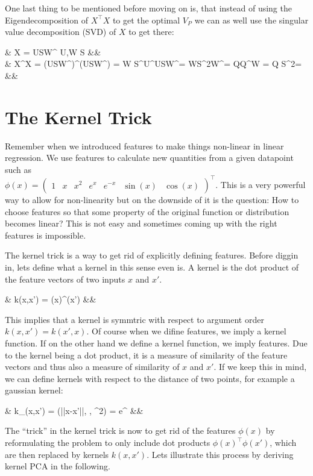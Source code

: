 \documentclass[12pt]{article}
\newcommand{\mat}[1]{\begin{pmatrix} #1 \end{pmatrix}}
\newcommand{\eqnsnn}[1]{\begin{flalign*} #1 \end{flalign*}}
\newcommand{\T}{^\top}
\newcommand{\mathtext}[1]{\quad\text{#1}\quad}
\begin{document}
One last thing to be mentioned before moving on is, that instead of using the Eigendecomposition of $X\T X$ to get the optimal $V_P$ we can as well use the singular value decomposition (SVD) of $X$ to get there:
\eqnsnn{&
X = USW\T \mathtext{with orthonormal} U,\;W \mathtext{and diagonal} S
&&\\&
X\T X = (USW\T)\T (USW\T) = W S\T U\T USW\T = WS^2W\T = Q\Lambda Q\T \implies W = Q \quad S^2=\Lambda
&&}


\section{The Kernel Trick}
Remember when we introduced features to make things non-linear in linear regression.
We use features to calculate new quantities from a given datapoint such as 
\\$\phi(x) = \mat{1 & x & x^2 & e^x & e^{-x} & \sin(x) & \cos(x)}\T$.
This is a very powerful way to allow for non-linearity but on the downside of it is the question:
How to choose features so that some property of the original function or distribution becomes linear?
This is not easy and sometimes coming up with the right features is impossible.

The kernel trick is a way to get rid of explicitly defining features.
Before diggin in, lets define what a kernel in this sense even is.
A kernel is the dot product of the feature vectors of two inputs $x$ and $x'$.
\eqnsnn{&
k(x,x') = \phi(x)\T\phi(x')
&&}
This implies that a kernel is symmtric with respect to argument order $k(x,x') = k(x',x)$.
Of course when we difine features, we imply a kernel function.
If on the other hand we define a kernel function, we imply features.
Due to the kernel being a dot product, it is a measure of similarity of the feature vectors and thus also a measure of similarity of $x$ and $x'$.
If we keep this in mind, we can define kernels with respect to the distance of two points, for example a gaussian kernel:
\eqnsnn{&
k_(x,x') = \mathcal{N}(||x-x'||, \mu, \sigma^2) = \frac1{\sqrt{2\pi\sigma^2}}e^{\frac{(||x-x'||-\mu)^2}{2\sigma^2}}
&&}

The \enquote{trick} in the kernel trick is now to get rid of the features $\phi(x)$ by reformulating the problem to only include dot products $\phi(x)\T\phi(x')$, which are then replaced by kernels $k(x,x')$.
Lets illustrate this process by deriving kernel PCA in the following.
\end{document}
